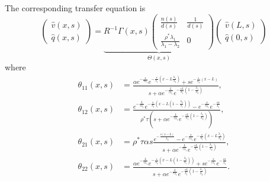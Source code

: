 \documentclass[letterpaper, 10 pt, conference]{ieeeconf}  %
\begin{document}
The corresponding transfer equation is
\begin{equation}
\begin{pmatrix}
	\hat{v}\left(x,s\right)
	\\
	\hat{q}\left(x,s\right)
\end{pmatrix}
=
\underset{\Theta\left(x,s\right)}{
\underbrace{
R^{-1}\Gamma\left(x,s\right)
\begin{pmatrix}
	\frac{n\left(s\right)}{d\left(s\right)}
		&
	\frac{1}{d\left(s\right)}	
	\\
	\frac{\rho^{*}\lambda_{1}}{\lambda_{1} - \lambda_{2}}
		&
	0
\end{pmatrix}
}
}
\begin{pmatrix}
	\hat{v}\left(L,s\right)
	\\
	\hat{q}\left(0,s\right)
\end{pmatrix}
\end{equation}
where
\begin{subequations}
\begin{align}
\theta_{11}\left(x,s\right) &=
\frac{
	\alpha 
		e^{
			-\frac{x}{\tau\lambda_{1}}
		}
		e^{
			-\frac{s}{\lambda_{1}}
				\left(
					x - L\frac{\lambda_{1}}{\lambda_{2}}
				\right)	
		}
	+
	s 
		e^{-\frac{s}{\lambda_{2}}\left(x - L\right)}
}{
	s
	+
	\alpha
	e^{-\frac{L}{\tau\lambda_{1}}}
	e^{
	-\frac{sL}{\lambda_{1}}
	\left(
		1 - \frac{\lambda_{1}}{\lambda_{2}}
	\right)
	}
}
,\\
\theta_{12}\left(x,s\right) &=
\frac{
	e^{-\frac{L}{\tau\lambda_{1}}}
	e^{-\frac{s}{\lambda_{2}}
		\left(
			x - L
				\left(1 - 
					\frac{\lambda_{2}}{\lambda_{1}}
				\right)
		\right)
	}
	-
	e^{-\frac{x}{\tau\lambda_{1}}}
	e^{-\frac{sx}{\lambda_{1}}}
}
{
	\rho^{*}\tau
	\left(
		s
		+
		\alpha
		e^{-\frac{L}{\tau\lambda_{1}}}
		e^{
			-\frac{sL}{\lambda_{1}}
			\left(
				1 - \frac{\lambda_{1}}{\lambda_{2}}
			\right)
			}
	\right)
},\\
\theta_{21}\left(x,s\right) &=
\rho^{*}\tau\alpha s
\frac{
	e^{-\frac{s\left(x-L\right)}{\lambda_{2}}}
	-
	e^{-\frac{x}{\tau\lambda_{1}}}
	e^{-\frac{s}{\lambda_{1}}
		\left(
			x - L\frac{\lambda_{1}}{\lambda_{2}}
		\right)
	}
}{
	s
	+
	\alpha
	e^{-\frac{L}{\tau\lambda_{1}}}
	e^{
	-\frac{sL}{\lambda_{1}}
	\left(
		1 - \frac{\lambda_{1}}{\lambda_{2}}
	\right)
	}
},\\
\theta_{22}\left(x,s\right) &=
\frac{
	\alpha
	e^{-\frac{L}{\tau\lambda_{1}}}
	e^{-\frac{s}{\lambda_{2}}
		\left(
			x - L
				\left(
				1 - \frac{\lambda_{2}}{\lambda_{1}}
				\right)
		\right)
	}
	+
	s
	e^{-\frac{x}{\tau\lambda_{1}}}
	e^{-\frac{sx}{\lambda_{1}}}
}{
	s
	+
	\alpha
	e^{-\frac{L}{\tau\lambda_{1}}}
	e^{
	-\frac{sL}{\lambda_{1}}
	\left(
		1 - \frac{\lambda_{1}}{\lambda_{2}}
	\right)
	}
}
.
\end{align}
\end{subequations}
\end{document}
